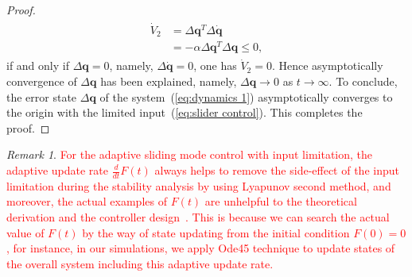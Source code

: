 \documentclass[3p]{elsarticle}
\theoremstyle{plain}
\theoremstyle{remark}
\newtheorem{myrem}{Remark}
\begin{document}
\begin{proof}
{\begin{align}
\begin{split}
\dot V_2 &= \Delta\bm q^T\Delta \dot{\bm q}\\
&=-\alpha \Delta \bm q^T\Delta \bm q\le 0,
\end{split}
\end{align}
if and only if $\Delta \bm q = 0$, namely, $\Delta \dot {\bm q} = 0$, one has $\dot V_2=0$. Hence asymptotically convergence of $\Delta \bm q$ has been explained, namely, $\Delta \bm q\rightarrow 0$ as $t\rightarrow \infty$. To conclude, the error state $\Delta \bm q$ of the system~(\ref{eq:dynamics 1}) asymptotically converges to the origin with the limited input~(\ref{eq:slider control})}. This completes the proof.
\end{proof}
\begin{myrem}
\textcolor{red}{For the adaptive sliding mode control with input limitation, the adaptive update rate $\frac{d}{dt}F(t)$ always helps to remove the side-effect of the input limitation during the stability analysis by using Lyapunov second method, and moreover, the actual examples of $F(t)$ are unhelpful to the theoretical derivation and the controller design~\cite{Hu2008552,6060930}. This is because we can search the actual value of $F(t)$  by the way of state updating from the initial condition $F(0)=0$, for instance, in our simulations, we apply Ode45 technique to update states of the overall system including this adaptive update rate.}
\end{myrem}
\end{document}
